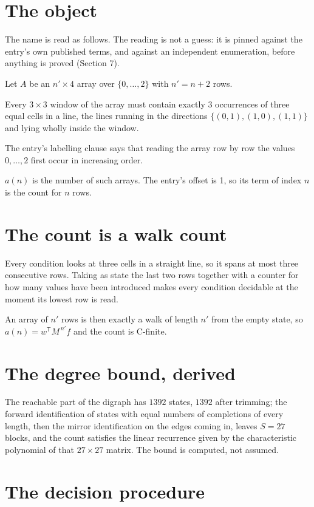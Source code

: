 \documentclass[11pt]{article}
\theoremstyle{definition}
\begin{document}
\section{The object}

The name is read as follows. The reading is not a guess: it is pinned against the entry's own published terms, and against an independent enumeration, before anything is proved (Section 7).

Let $A$ be an $n' \times 4$ array over $\{0,\dots,2\}$ with $n' = n + 2$ rows.

Every $3\times3$ window of the array must contain exactly $3$ occurrences of three equal cells in a line, the lines running in the directions $\{(0,1), (1,0), (1,1)\}$ and lying wholly inside the window.

The entry's labelling clause says that reading the array row by row the values $0,\dots,2$ first occur in increasing order.

$a(n)$ is the number of such arrays. The entry's offset is 1, so its term of index $n$ is the count for $n$ rows.

\section{The count is a walk count}

Every condition looks at three cells in a straight line, so it spans at most three consecutive rows. Taking as state the last two rows together with a counter for how many values have been introduced makes every condition decidable at the moment its lowest row is read.

An array of $n'$ rows is then exactly a walk of length $n'$ from the empty state, so $a(n) = w^{\mathsf T}M^{\,n'}f$ and the count is C-finite.

\section{The degree bound, derived}

The reachable part of the digraph has $1392$ states, $1392$ after trimming; the forward identification of states with equal numbers of completions of every length, then the mirror identification on the edges coming in, leaves $S = 27$ blocks, and the count satisfies the linear recurrence given by the characteristic polynomial of that $27\times27$ matrix. The bound is computed, not assumed.

\section{The decision procedure}
\end{document}
